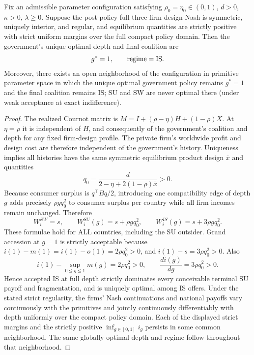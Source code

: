 \begin{proposition}
Fix an admissible parameter configuration satisfying
$\rho_0=\eta_0\in(0,1)$, $d>0$, $\kappa>0$, $\lambda\geq0$.
Suppose the post-policy full three-firm design Nash is
symmetric, uniquely interior, and regular, and equilibrium
quantities are strictly positive with strict uniform margins
over the full compact policy domain. Then the government's
unique optimal depth and final coalition are
\[
 g^*=1,\qquad {\rm regime}={\rm IS}.
\]
Moreover, there exists an open neighborhood of the
configuration in primitive parameter space in which the
unique optimal government policy remains $g^*=1$ and
the final coalition remains IS; SU and SW are never optimal
there (under weak acceptance at exact indifference).
\end{proposition}
\begin{proof}
The realized Cournot matrix is
$M=I+(\rho-\eta)H+(1-\rho)X$.
At $\eta=\rho$ it is independent of $H$, and consequently
of the government's coalition and depth for any fixed
firm-design profile. The private firm's worldwide profit and
design cost are therefore independent of the government's
history. Uniqueness implies all histories have the same
symmetric equilibrium product design $\bar x$ and quantities
\[
q_0=\frac{d}{2-\eta+2(1-\rho)\bar x}>0.
\]
Because consumer surplus is $q^\top Bq/2$, introducing
one compatibility edge of depth $g$ adds precisely
$\rho g q_0^2$ to consumer surplus per country while
all firm incomes remain unchanged. Therefore
\[
W_i^{SW}=s,\qquad W_i^{SU}(g)=s+\rho gq_0^2,\qquad
W_i^{IS}(g)=s+3\rho gq_0^2.
\]
These formulae hold for ALL countries, including the
SU outsider. Grand accession at $g=1$ is strictly
acceptable because $i(1)-m(1)=i(1)-o(1)
=2\rho q_0^2>0$, and $i(1)-s=3\rho q_0^2>0$.
Also
\[
i(1)-\sup_{0\le g\le1}m(g)
=2\rho q_0^2>0,\qquad
\frac{di(g)}{dg}=3\rho q_0^2>0.
\]
Hence accepted IS at full depth strictly dominates
every conceivable terminal SU payoff and fragmentation,
and is uniquely optimal among IS offers.
Under the stated strict regularity, the firms' Nash
continuations and national payoffs vary continuously
with the primitives and jointly continuously
differentiably with depth uniformly over the compact
policy domain. Each of the displayed strict margins
and the strictly positive $\inf_{g\in[0,1]}i_g$
persists in some common neighborhood.
The same globally optimal depth and regime follow
throughout that neighborhood.
\end{proof}

